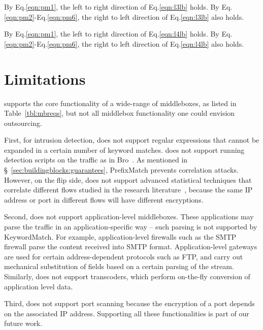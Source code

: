 By Eq.\eqref{eqn:pm1}, the left to right direction of 
Eq.\eqref{eqn:l3lb} holds. By Eq.\eqref{eqn:pm2}-Eq.\eqref{eqn:pm6}, the right to left 
direction of Eq.\eqref{eqn:l3lb} also holds.

By Eq.\eqref{eqn:pm1}, the left to right direction of 
Eq.\eqref{eqn:l4lb} holds. By Eq.\eqref{eqn:pm2}-Eq.\eqref{eqn:pm6}, the right to left 
direction of Eq.\eqref{eqn:l4lb} also holds.

\section{Limitations}
\label{s:limitations}

 \sys supports the core functionality of a wide-range of  middleboxes, as listed in Table~\ref{tbl:mbreqs},
but not all middlebox functionality one could envision outsourcing.

First, for intrusion detection, \sys does not support regular expressions that cannot be expanded 
in a certain number of keyword matches. \sys does not support running detection scripts on the traffic 
as in Bro~\cite{bro}. As mentioned in \S~\ref{sec:buildingblocks:guarantees}, PrefixMatch prevents correlation attacks.
However, on the flip side, \sys does not support advanced statistical techniques that correlate different flows
studied in the research literature~\cite{steppingstones}, because the same IP address or port in different flows
will have different encryptions.

Second, \sys does not support application-level middleboxes.
These applications may parse the traffic in an application-specific way -- such parsing is not supported by KeywordMatch.
For example, application-level firewalls such as the SMTP firewall parse the content received into SMTP format. Application-level gateways are used for  certain address-dependent 
protocols such as FTP, and carry 
out mechanical substitution of fields based on a certain parsing of the stream.
Similarly, \sys does not support transcoders, which perform on-the-fly conversion of application level 
data.

Third, \sys does not support port scanning because the encryption of a port depends on the associated IP address. 
Supporting all these functionalities is part of our future work.
